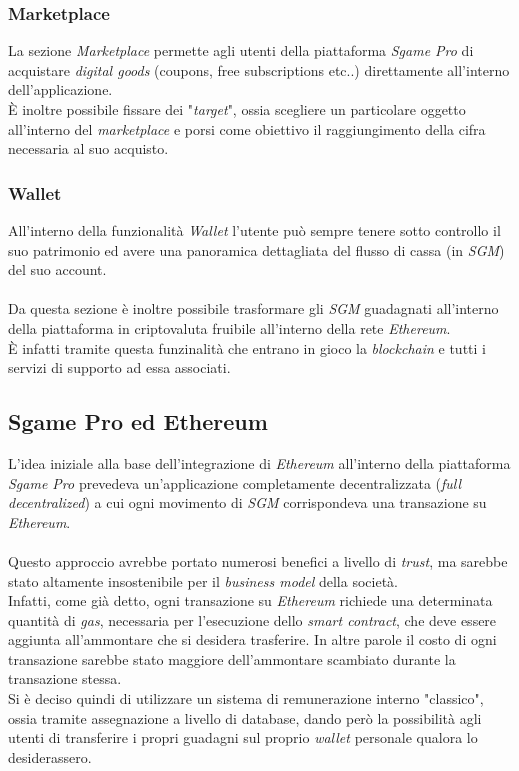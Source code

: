 \documentclass[11pt]{thesistemp}
\begin{document}
\subsubsection{Marketplace}

La sezione \textit{Marketplace} permette agli utenti della piattaforma \textit{Sgame Pro} di acquistare \textit{digital goods} (coupons, free subscriptions etc..) direttamente all'interno dell'applicazione.\\
\`E inoltre possibile fissare dei "\textit{target}", ossia scegliere un particolare oggetto all'interno del \textit{marketplace} e porsi come obiettivo il raggiungimento della cifra necessaria al suo acquisto.

\subsubsection{Wallet}

All'interno della funzionalità \textit{Wallet} l'utente può sempre tenere sotto controllo il suo patrimonio ed avere una panoramica dettagliata del flusso di cassa (in \textit{SGM}) del suo account.\\
\\
Da questa sezione è inoltre possibile trasformare gli \textit{SGM} guadagnati all'interno della piattaforma in criptovaluta fruibile all'interno della rete \textit{Ethereum}.\\
\`E infatti tramite questa funzinalità che entrano in gioco la \textit{blockchain} e tutti i servizi di supporto ad essa associati.
\pagebreak

\subsection{Sgame Pro ed Ethereum}

L'idea iniziale alla base dell'integrazione di \textit{Ethereum} all'interno della piattaforma \textit{Sgame Pro} prevedeva un'applicazione completamente decentralizzata (\textit{full decentralized}) a cui ogni movimento di \textit{SGM} corrispondeva una transazione su \textit{Ethereum}.\\\\
Questo approccio avrebbe portato numerosi benefici a livello di \textit{trust}, ma sarebbe stato altamente insostenibile per il \textit{business model} della società.\\
Infatti, come già detto, ogni transazione su \textit{Ethereum} richiede una determinata quantità di \textit{gas}, necessaria per l'esecuzione dello \textit{smart contract}, che deve essere aggiunta all'ammontare che si desidera trasferire.
In altre parole il costo di ogni transazione sarebbe stato maggiore dell'ammontare scambiato durante la transazione stessa.\\
Si è deciso quindi di utilizzare un sistema di remunerazione interno "classico", ossia tramite assegnazione a livello di database, dando però la possibilità agli utenti di transferire i propri guadagni sul proprio \textit{wallet} personale qualora lo desiderassero.
\end{document}
